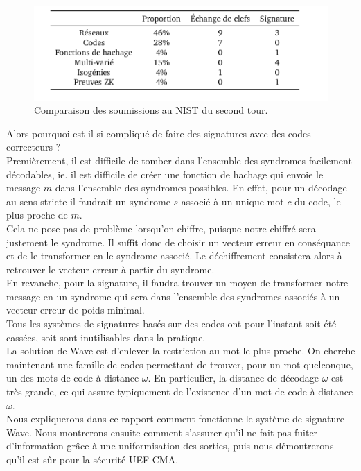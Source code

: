 \documentclass[12pt]{article}
\theoremstyle{plain}
\theoremstyle{definition}
\begin{document}
\begin{figure}[h]
\label{nist 2}
\begin{center}
\includegraphics [scale=0.4]{include/nist_second_tour.png}
\end{center}
\caption{\small Comparaison des soumissions au NIST du second tour.}
\end{figure}
\noindent Alors pourquoi est-il si compliqué de faire des signatures avec des codes correcteurs ? \\
Premièrement, il est difficile de tomber dans l'ensemble des syndromes facilement décodables, ie. il est difficile de créer une fonction de hachage qui envoie le message $m$ dans l'ensemble des syndromes possibles. En effet, pour un décodage au sens stricte il faudrait un syndrome $s$ associé à un unique mot $c$ du code, le plus proche de $m$.\\
Cela ne pose pas de problème lorsqu'on chiffre, puisque notre chiffré sera justement le syndrome. Il suffit donc de choisir un vecteur erreur en conséquance et de le transformer en le syndrome associé. Le déchiffrement consistera alors à retrouver le vecteur erreur à partir du syndrome. \\
En revanche, pour la signature, il faudra trouver un moyen de transformer notre message en un syndrome qui sera dans l'ensemble des syndromes associés à un vecteur erreur de poids minimal. \\
Tous les systèmes de signatures basés sur des codes ont pour l'instant soit été cassées, soit sont inutilisables dans la pratique.\\
La solution de Wave est d'enlever la restriction au mot le plus proche. On cherche maintenant une famille de codes permettant de trouver, pour un mot quelconque, un des mots de code à distance $\omega$. En particulier, la distance de décodage $\omega$ est très grande, ce qui assure typiquement de l’existence d’un mot de code à distance $\omega$.\\
Nous expliquerons dans ce rapport comment fonctionne le système de signature Wave. Nous montrerons ensuite comment s'assurer qu'il ne fait pas fuiter d'information grâce à une uniformisation des sorties, puis nous démontrerons qu'il est sûr pour la sécurité UEF-CMA.
\end{document}

